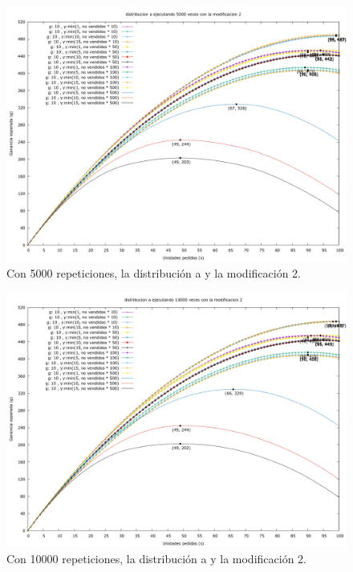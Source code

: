 \documentclass[12pt, spanish]{article}
\begin{document}
\begin{figure}[H]
	\centering
	\includegraphics[scale = 0.2]{prob_a/datos_a_5000_2.png}
	\caption{Con 5000 repeticiones, la distribución a y la modificación 2.}
	\label{fig:ej1_a_5000}

\end{figure}


\begin{figure}[H]
	\centering
	\includegraphics[scale = 0.2]{prob_a/datos_a_10000_2.png}
	\caption{Con 10000 repeticiones, la distribución a y la modificación 2.}
	\label{fig:ej1_a_10000}

\end{figure}
\end{document}
